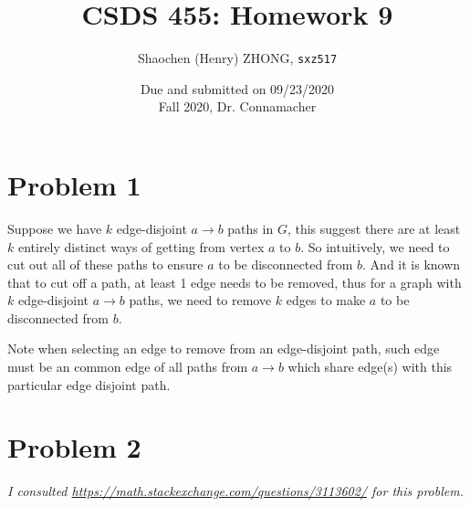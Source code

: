 \documentclass[11pt]{article}
\newcommand{\ilc}{\texttt}
\begin{document}
\title{\textbf{CSDS 455: Homework 9}}

\author{Shaochen (Henry) ZHONG, \ilc{sxz517}}
\date{Due and submitted on 09/23/2020 \\ Fall 2020, Dr. Connamacher}
\maketitle

\section*{Problem 1}

Suppose we have $k$ edge-disjoint $a \to b$ paths in $G$, this suggest there are at least $k$ entirely distinct ways of getting from vertex $a$ to $b$. So intuitively, we need to cut out all of these paths to ensure $a$ to be disconnected from $b$. And it is known that to cut off a path, at least 1 edge needs to be removed, thus for a graph with $k$ edge-disjoint $a \to b$ paths, we need to remove $k$ edges to make $a$ to be disconnected from $b$.

Note when selecting an edge to remove from an edge-disjoint path, such edge must be an common edge of all paths from $a \to b$ which share edge(s) with this particular edge disjoint path.


\section*{Problem 2}

\textit{I consulted \url{https://math.stackexchange.com/questions/3113602/} for this problem.}\newline
\end{document}
